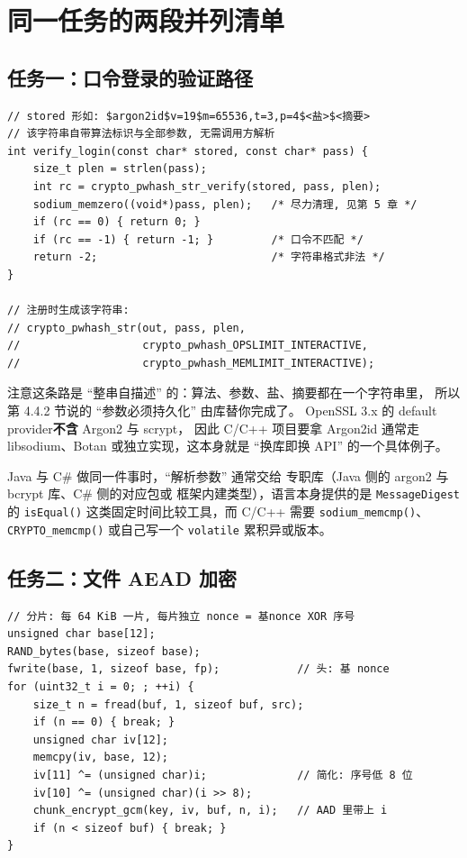 \documentclass[12pt,a4paper,fontset=fandol]{ctexbook}
\newcommand{\Fn}[1]{\texttt{#1()}}
\newcommand{\Tp}[1]{\texttt{#1}}
\newcommand{\CSharp}{C\#}
\newcommand{\CppJava}{C/C++}
\begin{document}
\section{同一任务的两段并列清单}

\subsection{任务一：口令登录的验证路径}

\begin{lstlisting}[caption={C/C++：Argon2id 口令校验（libsodium 路线）}]
// stored 形如: $argon2id$v=19$m=65536,t=3,p=4$<盐>$<摘要>
// 该字符串自带算法标识与全部参数, 无需调用方解析
int verify_login(const char* stored, const char* pass) {
    size_t plen = strlen(pass);
    int rc = crypto_pwhash_str_verify(stored, pass, plen);
    sodium_memzero((void*)pass, plen);   /* 尽力清理, 见第 5 章 */
    if (rc == 0) { return 0; }
    if (rc == -1) { return -1; }         /* 口令不匹配 */
    return -2;                           /* 字符串格式非法 */
}

// 注册时生成该字符串:
// crypto_pwhash_str(out, pass, plen,
//                   crypto_pwhash_OPSLIMIT_INTERACTIVE,
//                   crypto_pwhash_MEMLIMIT_INTERACTIVE);
\end{lstlisting}

注意这条路是 ``整串自描述'' 的：算法、参数、盐、摘要都在一个字符串里，
所以第 4.4.2 节说的 ``参数必须持久化'' 由库替你完成了。
OpenSSL 3.x 的 default provider\textbf{不含} Argon2 与 scrypt，
因此 \CppJava{} 项目要拿 Argon2id 通常走 libsodium、Botan
或独立实现，这本身就是 ``换库即换 API'' 的一个具体例子。

Java 与 \CSharp{} 做同一件事时，``解析参数'' 通常交给
专职库（Java 侧的 argon2 与 bcrypt 库、\CSharp{} 侧的对应包或
框架内建类型），语言本身提供的是 \Tp{MessageDigest} 的
\Fn{isEqual} 这类固定时间比较工具，而 \CppJava{} 需要
\Fn{sodium\_memcmp}、\Fn{CRYPTO\_memcmp} 或自己写一个
\texttt{volatile} 累积异或版本。

\subsection{任务二：文件 AEAD 加密}

\begin{lstlisting}[caption={C/C++：分片 AES-GCM 加密整个文件}]
// 分片: 每 64 KiB 一片, 每片独立 nonce = 基nonce XOR 序号
unsigned char base[12];
RAND_bytes(base, sizeof base);
fwrite(base, 1, sizeof base, fp);            // 头: 基 nonce
for (uint32_t i = 0; ; ++i) {
    size_t n = fread(buf, 1, sizeof buf, src);
    if (n == 0) { break; }
    unsigned char iv[12];
    memcpy(iv, base, 12);
    iv[11] ^= (unsigned char)i;              // 简化: 序号低 8 位
    iv[10] ^= (unsigned char)(i >> 8);
    chunk_encrypt_gcm(key, iv, buf, n, i);   // AAD 里带上 i
    if (n < sizeof buf) { break; }
}
\end{lstlisting}
\end{document}
